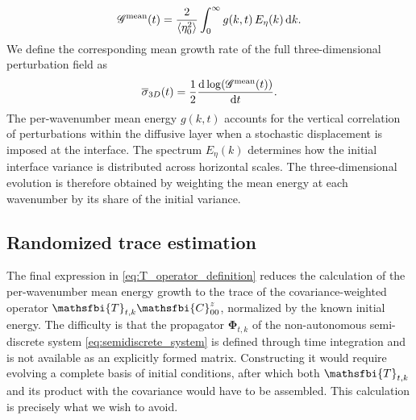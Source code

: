 \begin{equation}
    \mathscr{G}^{\mathrm{mean}}(t)
    =
    \frac{2}{\left\langle \eta_0^2 \right\rangle}
    \int_0^\infty
      g(k,t)\,
      E_{\eta}(k)\,
      \mathrm{d}k.
    \label{eq:gmean_eta_spectrum}
\end{equation}
We define the corresponding mean growth rate of the full three-dimensional perturbation field as
\begin{equation}
    \label{eq:sigma_3d}
    \overline{\sigma}_{3D}(t)
    =
    \frac{1}{2}
    \frac{\mathrm{d} 
        \log\!\left(\mathscr{G}^{\mathrm{mean}}(t)\right)
    }{\mathrm{d} t}.
\end{equation}
The per-wavenumber mean energy \(g(k,t)\) accounts for the vertical correlation of perturbations within the diffusive layer when a stochastic displacement is imposed at the interface. The spectrum \(E_{\eta}(k)\) determines how the initial interface variance is distributed across horizontal scales. The three-dimensional evolution is therefore obtained by weighting the mean energy at each wavenumber by its share of the initial variance.

\subsection{Randomized trace estimation}
\label{subsec:randomized_trace_estimation}
The final expression in \eqref{eq:T_operator_definition} reduces the calculation of the per-wavenumber mean energy growth to the trace of the covariance-weighted operator \(\mathsfbi{T}_{t,k}\mathsfbi{C}_{00}^{z}\), normalized by the known initial energy. The difficulty is that the propagator \(\boldsymbol{\Phi}_{t,k}\) of the non-autonomous semi-discrete system \eqref{eq:semidiscrete_system} is defined through time integration and is not available as an explicitly formed matrix. Constructing it would require evolving a complete basis of initial conditions, after which both \(\mathsfbi{T}_{t,k}\) and its product with the covariance would have to be assembled. This calculation is precisely what we wish to avoid.

